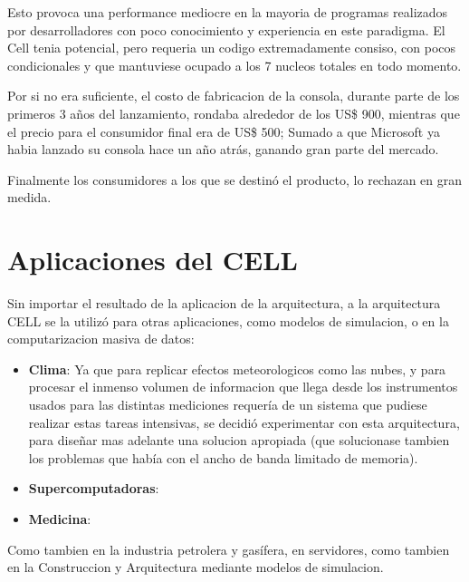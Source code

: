 \documentclass[10pt,compsoc]{IEEEtran}
\begin{document}
	 
		
	Esto provoca una performance mediocre en la mayoria de programas realizados por desarrolladores con poco conocimiento y experiencia en este paradigma. El Cell tenia potencial, pero requeria un codigo extremadamente consiso, con pocos condicionales y que mantuviese ocupado a los 7 nucleos totales en todo momento.\newline
	
	Por si no era suficiente, el costo de fabricacion de la consola, durante parte de los primeros 3 años del lanzamiento, rondaba alrededor de los US\$ 900, mientras que el precio para el consumidor final era de US\$ 500; Sumado a que Microsoft ya habia lanzado su consola hace un año atrás, ganando gran parte del mercado. \newline
	
	Finalmente los consumidores a los que se destinó el producto, lo rechazan en gran medida.
	
	
	\section{Aplicaciones del CELL}
	\noindent Sin importar el resultado de la aplicacion de la arquitectura, a la arquitectura CELL se la utilizó para otras aplicaciones, como modelos de simulacion, o en la computarizacion masiva de datos:
	
	\begin{itemize}
		
		\item{{\bf{Clima}}: Ya que para replicar efectos meteorologicos como las nubes, y para procesar el inmenso volumen de informacion que llega desde los instrumentos usados para las distintas mediciones requería de un sistema que pudiese realizar estas tareas intensivas, se decidió experimentar con esta arquitectura, para diseñar mas adelante una solucion apropiada (que solucionase tambien los problemas que había con el ancho de banda limitado de memoria).}\newline
		
		\item{{\bf{Supercomputadoras}}:}\newline
		
		\item{{\bf{Medicina}}:}\newline

	\end{itemize}
	Como tambien en la industria petrolera y gasífera, en servidores, como tambien en la Construccion y Arquitectura mediante modelos de simulacion.
	
\end{document}
